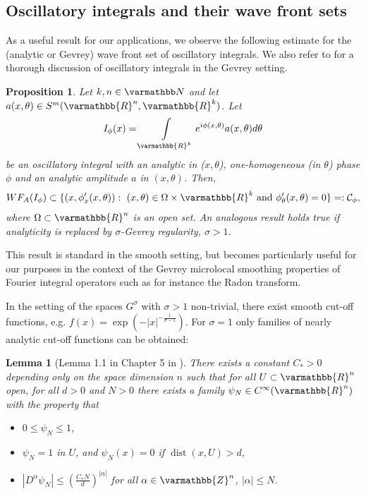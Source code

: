 \documentclass[12pt,twoside]{amsart}
\numberwithin{equation}{section}
\renewcommand{\leq}{\leqslant}
\renewcommand{\mathbb}{\varmathbb}
\newtheorem{lemma}[theorem]{Lemma}
\newtheorem{proposition}[theorem]{Proposition}
\newcommand {\R} {\mathbb{R}} \newcommand {\Z} {\mathbb{Z}}
\DeclareMathOperator {\dist} {dist}
\begin{document}
\begin{appendix}
\subsection{Oscillatory integrals and their wave front sets}
\label{sec:Gev_osc}

As a useful result for our applications, we observe the following estimate for the (analytic or Gevrey) wave front set of oscillatory integrals. We also refer to \cite{CZ} for a thorough discussion of oscillatory integrals in the Gevrey setting.

\begin{proposition}
\label{prop:analytic_FIO}
Let $k,n \in \N$ and let $a(x,\theta)\in S^m(\R^n, \R^k)$.
Let 
\begin{align*}
I_{\phi}(x) = \int\limits_{\R^k} e^{i\phi(x,\theta)}a(x,\theta)d\theta
\end{align*}
be an oscillatory integral with an analytic in ($x,\theta$), one-homogeneous (in $\theta$) phase $\phi$ and an analytic amplitude $a$ in $(x,\theta)$. Then,
\begin{align*}
WF_A(I_{\phi}) \subset \{(x,\phi_x'(x,\theta)): \ (x,\theta)\in \Omega \times \R^k \mbox{ and } \phi'_{\theta}(x,\theta)=0\}=:\mathcal{C}_{\phi},
\end{align*}
where $\Omega \subset \R^n$ is an open set. 
An analogous result holds true if analyticity is replaced by $\sigma$-Gevrey regularity, $\sigma>1$.
\end{proposition}

This result is standard in the smooth setting, but becomes particularly useful for our purposes in the context of the Gevrey microlocal smoothing properties of Fourier integral operators such as for instance the Radon transform. 

In the setting of the spaces $G^{\sigma}$ with $\sigma>1$ non-trivial, there exist smooth cut-off functions, e.g. $f(x)= \exp(-|x|^{-\frac{1}{\sigma-1}})$. For $\sigma=1$ only families of nearly analytic cut-off functions can be obtained:

\begin{lemma}[Lemma 1.1 in Chapter 5 in \cite{Treves}]
\label{lem:spatial_cutoff}
There exists a constant $C_{\ast}>0$ depending only on the space dimension $n$ such that for all $U \subset \R^n$ open, for all $d>0$ and $N>0$ there exists a family $\psi_N \in C^{\infty}(\R^n)$ with the property that
\begin{itemize}
\item $0\leq \psi_N \leq 1$,
\item $\psi_N = 1$ in $U$, and $\psi_N(x)=0$ if $\dist(x,U)>d$,
\item  $|D^{\alpha} \psi_N| \leq \left( \frac{C_{\ast} N}{d} \right)^{|\alpha|}$ for all $\alpha \in \Z^n$, $|\alpha | \leq N$.
\end{itemize}
\end{lemma}


\end{appendix}
\end{document}

